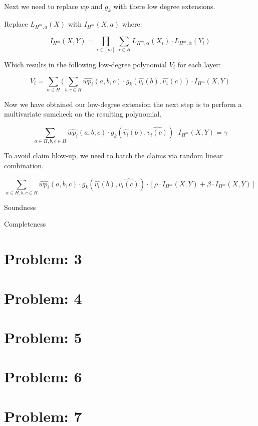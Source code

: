 \documentclass{article}
\begin{document}
Next we need to replace $wp$ and $g_{k}$ with there low degree extensions.

Replace $L_{H^{m},a}(X)$ with $I_{H^{m}}(X,a)$ where:

$$
I_{H^{m}}(X,Y)=\prod_{i \in [m]} \sum_{\alpha \in H} L_{H^{m},\alpha}(X_{i}) \cdot L_{H^{m},\alpha}(Y_{i})
$$

Which results in the following low-degree polynomial $V_{i}$ for each layer:

$$
V_{i}= \sum_{\alpha \in H} (\sum_{b, c \in H} \hat{wp_{i}}(a,b,c) \cdot g_{k}(\hat{v_{i}}(b), \hat{v_{1}}(c)) \cdot I_{H^{m}}(X, Y)
$$

Now we have obtained our low-degree extension the next step is to perform a multivariate sumcheck on the resulting polynomial.

$$
\sum_{\alpha \in H, b,c \in H} \hat{wp_{i}}(a,b,c) \cdot g_{k}(\hat{v_{i}}(b), \hat{v_{i}(c)}) \cdot I_{H^{m}}(X,Y) = \gamma
$$

To avoid claim blow-up, we need to batch the claims via random linear combination.

$$
\sum_{\alpha \in H, b,c \in H} \hat{wp_{i}}(a,b,c) \cdot g_{k}(\hat{v_{i}}(b), \hat{v_{i}(c)}) \cdot [\rho \cdot I_{H^{m}}(X,Y) + \beta \cdot I_{H^{m}}(X,Y)]
$$

Soundness

Completeness



\section{Problem: 3}
\section{Problem: 4}
\section{Problem: 5}
\section{Problem: 6}
\section{Problem: 7}
\end{document}
